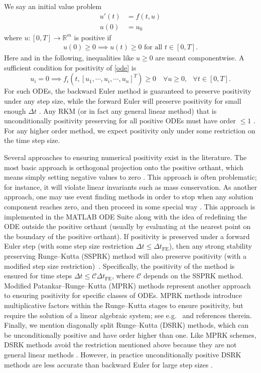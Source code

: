 \documentclass[a4paper]{article}
\numberwithin{equation}{section}
\theoremstyle{plain}
\theoremstyle{definition}
\numberwithin{theorem}{section}
\newcommand{\R}{\mathbb{R}}
\newcommand{\dt}{{\Delta t}}
\newcommand{\1}{\mathbbm{1}}
\begin{document}
We say an initial value problem
\begin{align} \label{ode}
    u'(t) & = f(t,u) \\
    u(0) & = u_0
\end{align}
where $u\colon [0,T] \to \R^m$ is positive if
\begin{align} \label{continuous-positivity}
    u(0)\ge 0 \implies u(t) \ge 0 \text{ for all } t \in [0,T].
\end{align}
Here and in the following, inequalities like $u \geq 0$ are meant componentwise.
A sufficient condition for positivity of \eqref{ode} is
\begin{equation} \label{eq:condition_ODE_pos}
u_i=0 \implies f_i(t,[u_1,\cdots,u_i,\cdots,u_n]^T) \geq 0 \quad \forall {u \geq 0,}\; \ \  \forall {t\in[0,T]}.
\end{equation}
For such ODEs, the backward Euler method is guaranteed to preserve positivity
under any step size, while the forward Euler will preserve positivity for small enough $\dt$ \cite{hundsdorfer_numerical_2003}.
Any RKM (or in fact any general linear method) that is unconditionally positivity preserving for all positive ODEs
must have order $\le 1$ \cite{bolley_conservation_1978}.
For any higher order method, we expect positivity only under some restriction
on the time step size.

Several approaches to ensuring numerical positivity exist in the literature.
The most basic approach is orthogonal projection onto the positive orthant,
which means simply setting negative values to zero \cite{shampine1986conservation}.  This approach is often problematic;
for instance, it will violate linear invariants such as mass conservation.
As another approach, one may use event finding methods in order to stop when any solution component
reaches zero, and then proceed in some special way
\cite{shampine_non-negative_2005}. This approach is implemented in the MATLAB
ODE Suite along with the idea of redefining the ODE outside the positive orthant (usually
by evaluating at the nearest point on the boundary of the positive orthant).
If positivity is preserved under a forward Euler step (with
some step size restriction $\dt \le \dt_\text{FE}$), then any strong stability preserving Runge--Kutta (SSPRK)
method will also preserve positivity (with a modified step size restriction)~\cite{gottlieb_strong_2011}.
Specifically, the positivity of the method is ensured for time steps
$\dt \leq {\mathcal C} \dt_\text{FE}$, where ${\mathcal C}$ depends on the SSPRK method.
Modified Patankar--Runge--Kutta (MPRK) methods represent another approach to ensuring
positivity for specific classes of ODEs. MPRK methods introduce multiplicative
factors within the Runge--Kutta stages to ensure positivity, but require the solution
of a linear algebraic system; see e.g.\ \cite{kopecz_comparison_2019} and references therein.
Finally, we mention diagonally split Runge--Kutta (DSRK) methods, which can be unconditionally
positive and have order higher than one. Like MPRK schemes, DSRK methods avoid
the restriction mentioned above because
they are not general linear methods \cite{horvath_positivity_1998}.  However, in practice
unconditionally positive DSRK methods are less accurate than backward Euler for
large step sizes \cite{macdonald2007}.
\end{document}

